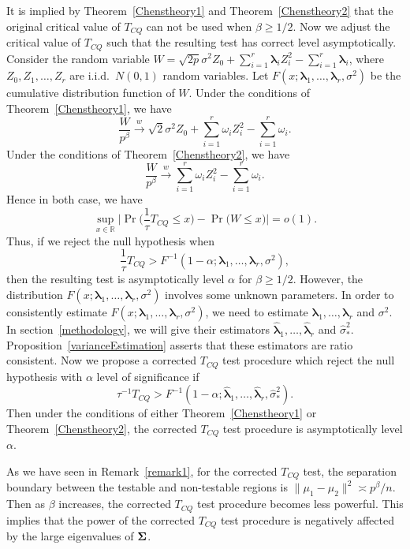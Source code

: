 \documentclass[review]{elsarticle}
\newcommand{\bfsym}[1]{\ensuremath{\boldsymbol{#1}}}
\def\blambda {\bfsym {\lambda}}        \def\bLambda {\bfsym {\Lambda}}
\theoremstyle{plain}
\theoremstyle{definition}
\theoremstyle{remark}
\begin{document}
It is implied by Theorem~\ref{Chenstheory1} and Theorem~\ref{Chenstheory2} that the original critical value of $T_{CQ}$ can not be used when $\beta\geq 1/2$.
Now we adjust the critical value of $T_{CQ}$ such that the resulting test has correct level asymptotically.
Consider the random variable
$
W=
\sqrt{2p}\sigma^2 Z_0
+
        \sum_{i=1}^r \blambda_i Z_i^2
            -
        \sum_{i=1}^r \blambda_i
        $, 
where $Z_0,Z_1,\ldots,Z_r$ are i.i.d.\ $N(0,1)$ random variables.
Let $F(x;\blambda_1,\ldots,\blambda_r,\sigma^2)$ be the cumulative distribution function of $W$.
Under the conditions of Theorem~\ref{Chenstheory1}, we have
$$
\frac{W}{p^{\beta}}\xrightarrow{w}
\sqrt{2}\sigma^2 Z_0 + \sum_{i=1}^r \omega_i Z_i^2 -\sum_{i=1}^r \omega_i.
$$
Under the conditions of Theorem~\ref{Chenstheory2}, we have
$$
\frac{W}{p^{\beta}}\xrightarrow{w}
\sum_{i=1}^r \omega_i Z_i^2 -\sum_{i=1}^r \omega_i.
$$
Hence in both case, we have
$$
\sup_{x\in\mathbb{R}}\big|\Pr\big(\frac{1}{\tau}T_{CQ}\leq x\big)-\Pr\big(W\leq x\big)\big|
=o(1).
$$
Thus, if we reject the null hypothesis when
$$
\frac{1}{\tau}T_{CQ}>
F^{-1}(1-\alpha;\blambda_1,\ldots,\blambda_r,\sigma^2),
$$
then the resulting test is asymptotically level $\alpha$ for $\beta\geq 1/2$.
        However, the distribution $F(x;\blambda_1,\ldots,\blambda_r,\sigma^2)$ involves some unknown parameters.
In order to consistently estimate $F(x;\blambda_1,\ldots,\blambda_r,\sigma^2)$, we need to estimate $\blambda_1,\ldots,\blambda_r$ and $\sigma^2$.
In section~\ref{methodology}, we will give their estimators $\hat{\blambda}_1,\ldots,\hat{\blambda}_r$ and $\hat{\sigma}_{*}^2$. 
Proposition~\ref{varianceEstimation} asserts that these estimators are ratio consistent. 
Now we propose a corrected $T_{CQ}$ test procedure which reject the null hypothesis with $\alpha$ level of significance if
$$
\tau^{-1}{T_{CQ}}> F^{-1}(1-\alpha;\hat{\blambda}_1,\ldots,\hat{\blambda}_r,\hat{\sigma}_*^2).
$$
Then under the conditions of either Theorem~\ref{Chenstheory1} or Theorem~\ref{Chenstheory2}, the corrected $T_{CQ}$ test procedure is  asymptotically level $\alpha$.

As we have seen in Remark~\ref{remark1}, for the corrected $T_{CQ}$ test, the separation boundary between the testable and non-testable regions  is $\|\mu_1-\mu_2\|^2\asymp p^{\beta}/n$.
Then as $\beta$ increases, the corrected $T_{CQ}$ test procedure becomes less powerful.
This implies that the power of the corrected $T_{CQ}$ test procedure is negatively affected by the large eigenvalues of $\bSigma$.
\end{document}
